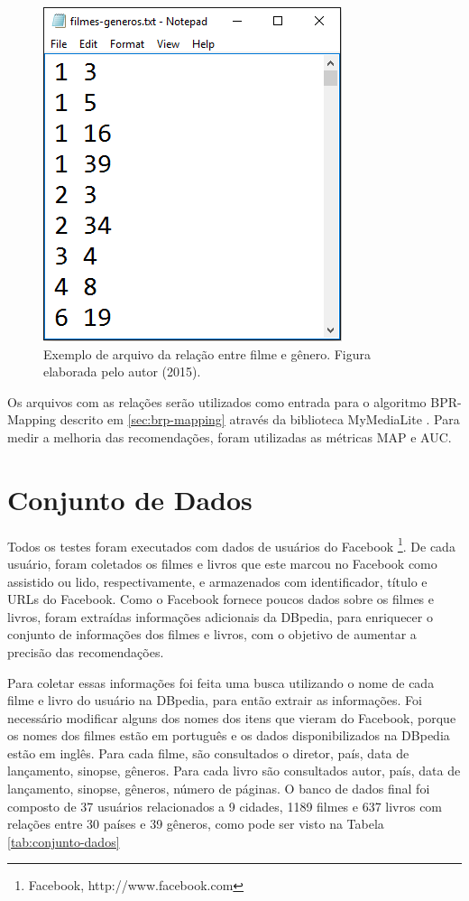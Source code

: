 \begin{figure}
	\centering
	\includegraphics[scale=0.45]{imagens/movie-genre.png}
	\caption{Exemplo de arquivo da relação entre filme e gênero. Figura elaborada pelo autor (2015).}
	\label{fig:movie-genre-file}
\end{figure}

Os arquivos com as relações serão utilizados como entrada para o algoritmo BPR-Mapping descrito em \ref{sec:brp-mapping} através da biblioteca MyMediaLite \citep{gantner2011}. Para medir a melhoria das recomendações, foram utilizadas as métricas \ac{MAP} e \ac{AUC}.



\section{Conjunto de Dados}

Todos os testes foram executados com dados de usuários do Facebook \footnote{Facebook, http://www.facebook.com}. De cada usuário, foram coletados os filmes e livros que este marcou no Facebook como assistido ou lido, respectivamente, e armazenados com identificador, título e URLs do Facebook. Como o Facebook fornece poucos dados sobre os filmes e livros, foram extraídas informações adicionais da DBpedia, para enriquecer o conjunto de informações dos filmes e livros, com o objetivo de aumentar a precisão das recomendações.

Para coletar essas informações foi feita uma busca utilizando o nome de cada filme e livro do usuário na DBpedia, para então extrair as informações. Foi necessário modificar alguns dos nomes dos itens que vieram do Facebook, porque os nomes dos filmes estão em português e os dados disponibilizados na DBpedia estão em inglês. Para cada filme, são consultados o diretor, país, data de lançamento, sinopse, gêneros. Para cada livro são consultados autor, país, data de lançamento, sinopse, gêneros, número de páginas. O banco de dados final foi composto de 37 usuários relacionados a 9 cidades, 1189 filmes e 637 livros com relações entre 30 países e 39 gêneros, como pode ser visto na Tabela \ref{tab:conjunto-dados}


